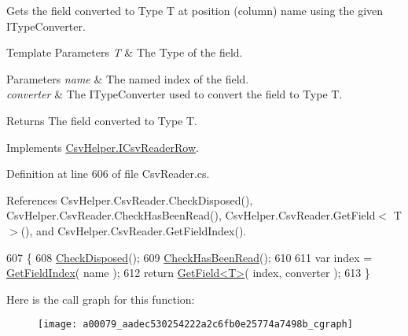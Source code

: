 Gets the field converted to Type T at position (column) name using the given I\-Type\-Converter. 


\begin{DoxyTemplParams}{Template Parameters}
{\em T} & The Type of the field.\\
\hline
\end{DoxyTemplParams}

\begin{DoxyParams}{Parameters}
{\em name} & The named index of the field.\\
\hline
{\em converter} & The I\-Type\-Converter used to convert the field to Type T.\\
\hline
\end{DoxyParams}
\begin{DoxyReturn}{Returns}
The field converted to Type T.
\end{DoxyReturn}


Implements \hyperlink{a00117_a640689c76826aafd8c79ff71d4f0992d}{Csv\-Helper.\-I\-Csv\-Reader\-Row}.



Definition at line 606 of file Csv\-Reader.\-cs.



References Csv\-Helper.\-Csv\-Reader.\-Check\-Disposed(), Csv\-Helper.\-Csv\-Reader.\-Check\-Has\-Been\-Read(), Csv\-Helper.\-Csv\-Reader.\-Get\-Field$<$ T $>$(), and Csv\-Helper.\-Csv\-Reader.\-Get\-Field\-Index().


\begin{DoxyCode}
607         \{
608             \hyperlink{a00079_a6fa45a46ed1322dc1872ca2321b5edbc}{CheckDisposed}();
609             \hyperlink{a00079_a2d9249171ed1568e45d152766d364c31}{CheckHasBeenRead}();
610 
611             var index = \hyperlink{a00079_a7e507d40e35fde7bf23e208be7be0884}{GetFieldIndex}( name );
612             \textcolor{keywordflow}{return} \hyperlink{a00079_a6a43cfaf39caea93ecd87e506be7b404}{GetField<T>}( index, converter );
613         \}
\end{DoxyCode}


Here is the call graph for this function\-:
\nopagebreak
\begin{figure}[H]
\begin{center}
\leavevmode
\texttt{[image: a00079\_aadec530254222a2c6fb0e25774a7498b\_cgraph]}
\end{center}
\end{figure}


